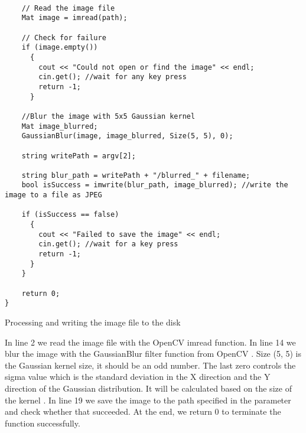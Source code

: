 \begin{listing}[ht]
\begin{verbatim}

    // Read the image file
    Mat image = imread(path);

    // Check for failure
    if (image.empty())
      {
        cout << "Could not open or find the image" << endl;
        cin.get(); //wait for any key press
        return -1;
      }

    //Blur the image with 5x5 Gaussian kernel
    Mat image_blurred;
    GaussianBlur(image, image_blurred, Size(5, 5), 0);

    string writePath = argv[2];

    string blur_path = writePath + "/blurred_" + filename;
    bool isSuccess = imwrite(blur_path, image_blurred); //write the image to a file as JPEG

    if (isSuccess == false)
      {
        cout << "Failed to save the image" << endl;
        cin.get(); //wait for a key press
        return -1;
      }
    }

    return 0;
}
\end{verbatim}
\caption{Processing and writing the image file to the disk}
\label{listing:c++-write}
\end{listing}

In line 2 we read the image file with the OpenCV imread function. In line 14 we blur the image with the GaussianBlur filter function from OpenCV \cite{gaussianblur}. Size (5, 5) is the Gaussian kernel size, it should be an odd number. The last zero controls the sigma value which is the standard deviation in the X direction and the Y direction of the Gaussian distribution. It will be calculated based on the size of the kernel \cite{gaussianblurtutorial}. In line 19 we save the image to the path specified in the parameter and check whether that succeeded. At the end, we return 0 to terminate the function successfully.
